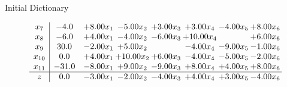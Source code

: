 \documentclass[8pt]{article}
\begin{document}
Initial Dictionary 

\[\begin{array}{c| c c@{\hskip 2pt} c@{\hskip 2pt} c@{\hskip 2pt} c@{\hskip 2pt} c@{\hskip 2pt} c@{\hskip 2pt} }
 x_{7}   &  -4.0 & +  8.00 x_{1} & -5.00 x_{2} & +  3.00 x_{3} & +  3.00 x_{4} & -4.00 x_{5} & +  8.00 x_{6}\\
 x_{8}   &  -6.0 & +  4.00 x_{1} & -4.00 x_{2} & -6.00 x_{3} & + 10.00 x_{4} &   & +  6.00 x_{6}\\
 x_{9}   &  30.0 & -2.00 x_{1} & +  5.00 x_{2} &   & -4.00 x_{4} & -9.00 x_{5} & -1.00 x_{6}\\
 x_{10}   &  0.0 & +  4.00 x_{1} & + 10.00 x_{2} & +  6.00 x_{3} & -4.00 x_{4} & -5.00 x_{5} & -2.00 x_{6}\\
 x_{11}   &  -31.0 & -8.00 x_{1} & +  9.00 x_{2} & -9.00 x_{3} & +  8.00 x_{4} & +  4.00 x_{5} & +  8.00 x_{6}\\
\hline
z    &  0.0 & -3.00 x_{1} & -2.00 x_{2} & -4.00 x_{3} & +  4.00 x_{4} & +  3.00 x_{5} & -4.00 x_{6}\\
\end{array}\]
\end{document}
